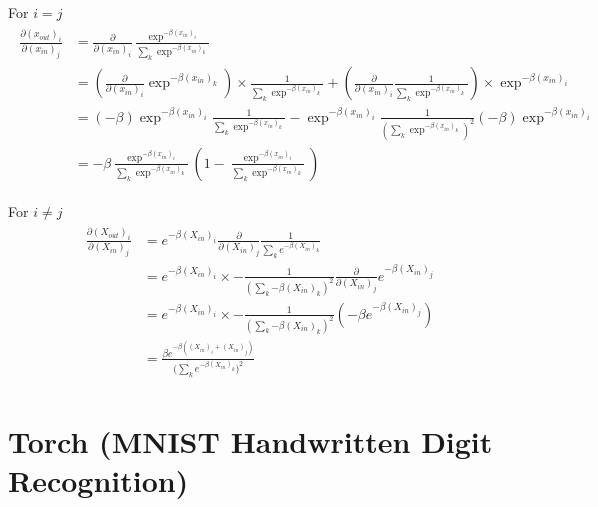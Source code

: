 \documentclass[paper=a4, fontsize=11pt]{scrartcl} %
\numberwithin{equation}{section} %
\numberwithin{figure}{section} %
\numberwithin{table}{section} %
\begin{document}
For $i = j$\\
\begin{align} 
\begin{split}
\frac{\partial (x_{out})_i}{\partial (x_{in})_j} &= \frac{\partial}{\partial (x_{in})_i} \frac{\exp^{-\beta(x_{in})_i}}{\sum_k{\exp^{-\beta(x_{in})_k}}}\\ 
&= (\frac{\partial}{\partial (x_{in})_i} \exp^{-\beta(x_{in})_k}) \times \frac{1}{\sum_k{\exp^{-\beta(x_{in})_k}}} +  (\frac{\partial}{\partial (x_{in})_i} \frac{1}{\sum_k{\exp^{-\beta(x_{in})_k}}}) \times \exp^{-\beta(x_{in})_i}\\
&= (-\beta)\exp^{-\beta{(x_{in})_i}} \frac{1}{\sum_k{\exp^{-\beta(x_{in})_k}}} - \exp^{-\beta(x_{in})_i} \frac{1}{(\sum_k{\exp^{-\beta(x_{in})_k}})^2} (-\beta) \exp^{-\beta(x_{in})_i}\\ 
&= -\beta \frac{\exp^{-\beta(x_{in})_i}}{\sum_k{\exp^{-\beta(x_{in})_k}}} (1 - \frac{\exp^{-\beta(x_{in})_i}}{\sum_k{\exp^{-\beta(x_{in})_k}}})
\end{split}         
\end{align}

For $i \neq j$\\
\begin{align} 
\begin{split}
\frac{\partial (X_{out})_i}{\partial (X_{in})_j} &= e^{-\beta(X_{in})_i} \frac{\partial}{\partial (X_{in})_j}\frac{1}{\sum_k{e^{-\beta(X_{in})_k}}}\\ 
&= e^{-\beta(X_{in})_i} \times -\frac{1}{(\sum_k{-\beta(X_{in})_k})^2} \frac{\partial}{\partial (X_{in})_j}e^{-\beta(X_{in})_j} \\
&= e^{-\beta(X_{in})_i} \times -\frac{1}{(\sum_k{-\beta(X_{in})_k})^2}(-\beta e^{-\beta(X_{in})_j}) \\
&= \frac{\beta e^{-\beta((X_{in})_i + (X_{in})_j)}}{(\sum_k{e^{-\beta(X_{in})_k})^2}} 
\end{split}         
\end{align}
\newpage

\section{\textbf{Torch (MNIST Handwritten Digit Recognition)}}
\end{document}
